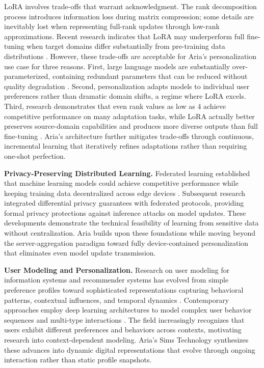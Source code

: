 \documentclass[11pt]{article}
\begin{document}
LoRA involves trade-offs that warrant acknowledgment. The rank decomposition 
process introduces information loss during matrix compression; some details 
are inevitably lost when representing full-rank updates through low-rank 
approximations. Recent research indicates that LoRA may underperform full 
fine-tuning when target domains differ substantially from pre-training data 
distributions \cite{biderman2024lora}. However, these trade-offs are acceptable 
for Aria's personalization use case for three reasons. First, large language 
models are substantially over-parameterized, containing redundant parameters 
that can be reduced without quality degradation \cite{aghajanyan2020intrinsic}. 
Second, personalization adapts models to individual user preferences rather 
than dramatic domain shifts, a regime where LoRA excels. Third, research 
demonstrates that even rank values as low as 4 achieve competitive performance 
on many adaptation tasks, while LoRA actually better preserves source-domain 
capabilities and produces more diverse outputs than full fine-tuning 
\cite{biderman2024lora}. Aria's architecture further mitigates trade-offs through 
continuous, incremental learning that iteratively refines adaptations rather 
than requiring one-shot perfection.

\textbf{Privacy-Preserving Distributed Learning.} Federated learning established that machine learning models could achieve competitive performance while keeping training data decentralized across edge devices \cite{mcmahan2017communication}. Subsequent research integrated differential privacy guarantees with federated protocols, providing formal privacy protections against inference attacks on model updates. These developments demonstrate the technical feasibility of learning from sensitive data without centralization. Aria builds upon these foundations while moving beyond the server-aggregation paradigm toward fully device-contained personalization that eliminates even model update transmission.

\textbf{User Modeling and Personalization.} Research on user modeling for information systems and recommender systems has evolved from simple preference profiles toward sophisticated representations capturing behavioral patterns, contextual influences, and temporal dynamics \cite{eke2019survey}. Contemporary approaches employ deep learning architectures to model complex user behavior sequences and multi-type interactions \cite{he2023survey}. The field increasingly recognizes that users exhibit different preferences and behaviors across contexts, motivating research into context-dependent modeling. Aria's Sims Technology synthesizes these advances into dynamic digital representations that evolve through ongoing interaction rather than static profile snapshots.
\end{document}
